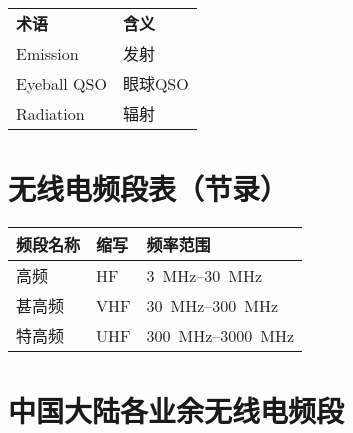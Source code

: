 \begin{longtable}[l]{ll}
	\textbf{术语} & \textbf{含义} \\
	Emission    & 发射          \\
	Eyeball QSO & 眼球QSO       \\
	Radiation   & 辐射          \\
\end{longtable}

\newpage

\section{无线电频段表（节录）}

\begin{longtable}[c]{|l|l|l|}
	\hline
	\textbf{频段名称} & \textbf{缩写}  & \textbf{频率范围}                               \\
	\hline
	高频            & HF  & \qtyrange[range-phrase=--]{3}{30}{\MHz}     \\
	\hline
	甚高频           & VHF & \qtyrange[range-phrase=--]{30}{300}{\MHz}   \\
	\hline
	特高频           & UHF & \qtyrange[range-phrase=--]{300}{3000}{\MHz} \\
	\hline
\end{longtable}

\newpage

\section{中国大陆各业余无线电频段}

